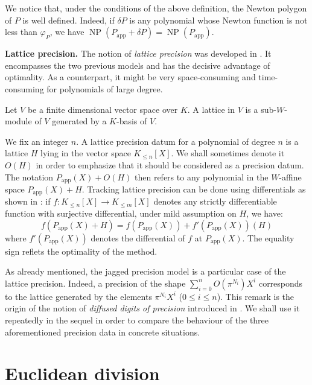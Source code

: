 \documentclass{sig-alternate-2013}
\DeclareMathOperator{\NP}{NP}
\newcommand{\app}{\textrm{app}}
\begin{document}
We notice that, under the conditions of the above definition, the
Newton polygon of $P$ is well defined. Indeed, if $\delta P$ is any
polynomial whose Newton function is not less than $\varphi_P$, we
have $\NP(P_\app + \delta P) = \NP(P_\app)$.

\medskip

\noindent
{\bf Lattice precision.}
The notion of \emph{lattice precision} was developed in 
\cite{padicprec}. It encompasses the two previous models and has
the decisive advantage of optimality. As a counterpart, it might be
very space-consuming and time-consuming for polynomials of large
degree.

\begin{deftn}
Let $V$ be a finite dimensional vector space over $K$. A lattice
in $V$ is a sub-$W$-module of $V$ generated by a $K$-basis of
$V$.
\end{deftn}

\noindent
We fix an integer $n$. A lattice precision datum for a polynomial of 
degree $n$ is a lattice $H$ lying in the vector space $K_{\leq n}[X]$. 
We shall sometimes denote it $O(H)$ in order to emphasize that it should 
be considered as a precision datum. The notation $P_\app(X) + O(H)$ then 
refers to any polynomial in the $W$-affine space $P_\app(X) + H$. 
Tracking lattice precision can be done using differentials as shown in
\cite[Lemma~3.4 and Proposition~3.12]{padicprec}: if $f : K_{\leq n}[X] 
\to K_{\leq m}[X]$ denotes any strictly differentiable function with
surjective differential, under mild assumption on $H$, we have:
$$f(P_\app(X)+H) = f(P_\app(X)) + f'(P_\app(X))(H)$$
where $f'(P_\app(X))$ denotes the differential of $f$ at $P_\app(X)$. 
The equality sign reflets the optimality of the method.

As already mentioned, the jagged precision model is a particular case of 
the lattice precision. Indeed, a precision of the shape $\sum_{i=0}^n 
O(\pi^{N_i}) X^i$ corresponds to the lattice generated by the elements 
$\pi^{N_i} X^i$ ($0 \leq i \leq n$). This remark is the origin of the 
notion of \emph{diffused digits of precision} introduced in 
\cite[Definition 2.3]{preclinalg}. We shall use it repeatedly in the 
sequel in order to compare the behaviour of the three aforementioned 
precision data in concrete situations.

\section{Euclidean division}
\end{document}
